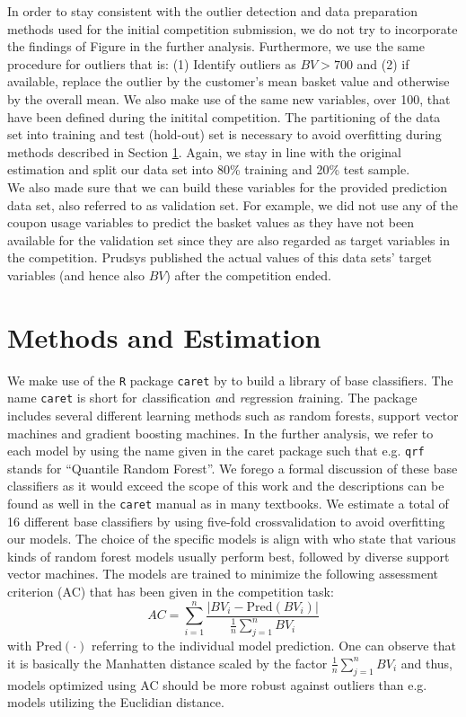 \documentclass[12pt]{article}
\begin{document}
In order to stay consistent with the outlier detection and data preparation methods used for the initial competition submission, we do not try to incorporate the findings of Figure \label{ref:histbv} in the further analysis. Furthermore, we use the same procedure for outliers that is: (1) Identify outliers as $BV > 700$ and (2) if available, replace the outlier by the customer's mean basket value and otherwise by the overall mean.
We also make use of the same new variables, over 100, that have been defined during the initital competition.
The partitioning of the data set into training and test (hold-out) set is necessary to avoid overfitting during methods described in Section \ref{sect:meth}. Again, we stay in line with the original estimation and split our data set into 80\% training and 20\% test sample.\\

We also made sure that we can build these variables for the provided prediction data set, also referred to as validation set. For example, we did not use any of the coupon usage variables to predict the basket values as they have not been available for the validation set since they are also regarded as target variables in the competition.
Prudsys published the actual values of this data sets' target variables (and hence also $BV$) after the competition ended.  

\section{Methods and Estimation}
\label{sect:meth}
We make use of the \texttt{R} package \texttt{caret} by \cite{caret} to build a library of base classifiers. The name \texttt{caret} is short for \textit{c}lassification \textit{a}nd \textit{re}gression \textit{t}raining. The package includes several different learning methods such as random forests, support vector machines and gradient boosting machines. In the further analysis, we refer to each model by using the name given in the caret package such that e.g. \texttt{qrf} stands for ``Quantile Random Forest''. 
We forego a formal discussion of these base classifiers as it would exceed the scope of this work and the descriptions can be found as well in the \texttt{caret} manual as in many textbooks. We estimate a total of 16 different base classifiers by using five-fold crossvalidation to avoid overfitting our models.
The choice of the specific models is align with \cite{Fernandez-Delgado2014} who state that various kinds of random forest models usually perform best, followed by diverse support vector machines.
The models are trained to minimize the following assessment criterion (AC) that has been given in the competition task:
\begin{equation}
AC = \sum_{i=1}^n \frac{|BV_{i} - \mbox{Pred}(BV_{i})|}{\frac{1}{n} \sum_{j=1}^n BV_{i}}
\end{equation}
with $\mbox{Pred}(\cdot)$ referring to the individual model prediction. One can observe that it is basically the Manhatten distance scaled by the factor  $\frac{1}{n} \sum_{j=1}^n BV_{i}$ and thus, models optimized using AC should be more robust against outliers than e.g. models utilizing the Euclidian distance. \\
\end{document}
